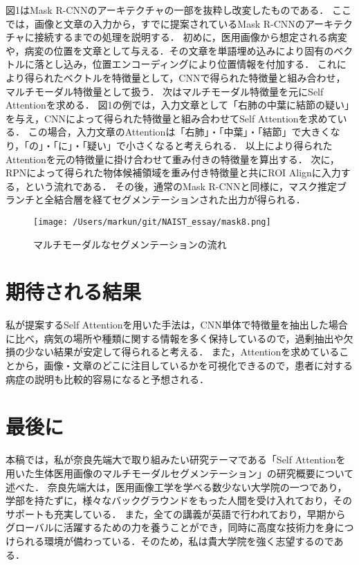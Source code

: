 \documentclass[a4j,10pt,twocolumn]{jarticle}
\begin{document}
図1はMask R-CNNのアーキテクチャの一部を抜粋し改変したものである．
ここでは，画像と文章の入力から，すでに提案されているMask R-CNNのアーキテクチャに接続するまでの処理を説明する．
初めに，医用画像から想定される病変や，病変の位置を文章として与える．その文章を単語埋め込み\cite{堅山耀太郎2017word}により固有のベクトルに落とし込み，位置エンコーディングにより位置情報を付加する．
これにより得られたベクトルを特徴量として，CNNで得られた特徴量と組み合わせ，マルチモーダル特徴量として扱う．
次はマルチモーダル特徴量を元にSelf Attentionを求める．
図1の例では，入力文章として「右肺の中葉に結節の疑い」を与え，CNNによって得られた特徴量と組み合わせてSelf Attentionを求めている．
この場合，入力文章のAttentionは「右肺」・「中葉」・「結節」で大きくなり，「の」・「に」・「疑い」で小さくなると考えられる．
以上により得られたAttentionを元の特徴量に掛け合わせて重み付きの特徴量を算出する．
次に，RPN\cite{ren2015faster}によって得られた物体候補領域を重み付き特徴量と共にROI Alignに入力する，という流れである．
その後，通常のMask R-CNNと同様に，マスク推定ブランチと全結合層を経てセグメンテーションされた出力が得られる．
\begin{figure}[hb]%
    \centering\texttt{[image: /Users/markun/git/NAIST\_essay/mask8.png]}
    \caption{マルチモーダルなセグメンテーションの流れ}
\end{figure}
\vspace{-1zh}
\section{期待される結果}
私が提案するSelf Attentionを用いた手法は，CNN単体で特徴量を抽出した場合に比べ，病気の場所や種類に関する情報を多く保持しているので，過剰抽出や欠損の少ない結果が安定して得られると考える．
また，Attentionを求めていることから，画像・文章のどこに注目しているかを可視化できるので，患者に対する病症の説明も比較的容易になると予想される．

\section{最後に}
本稿では，私が奈良先端大で取り組みたい研究テーマである「Self Attentionを用いた生体医用画像のマルチモーダルセグメンテーション」の研究概要について述べた．
奈良先端大は，医用画像工学を学べる数少ない大学院の一つであり，学部を持たずに，様々なバックグラウンドをもった人間を受け入れており，そのサポートも充実している．
また，全ての講義が英語で行われており，早期からグローバルに活躍するための力を養うことができ，同時に高度な技術力を身につけられる環境が備わっている．そのため，私は貴大学院を強く志望するのである．

{\scriptsize


\makeatletter
 \renewcommand{\@cite}[2]{\leavevmode%
 \hbox{$^{\mbox{\the\scriptfont0 #1}}$}}
\makeatother
}
\end{document}
